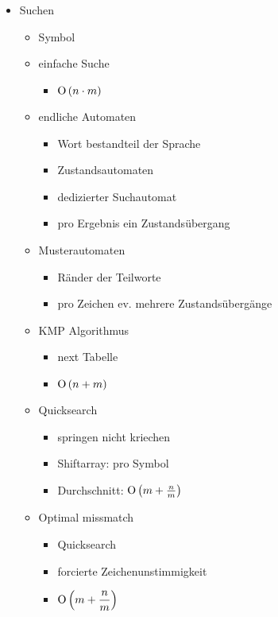 \begin{itemize}
    \item Suchen
    \begin{itemize}
        \item Symbol
        \item einfache Suche
        \begin{itemize}
            \item $\operatorname{O}\left(n \cdot m\right)$
        \end{itemize}
        \item endliche Automaten
        \begin{itemize}
            \item Wort bestandteil der Sprache
            \item Zustandsautomaten
            \item dedizierter Suchautomat
            \item pro Ergebnis ein Zustandsübergang
        \end{itemize}
        \item Musterautomaten
        \begin{itemize}
            \item Ränder der Teilworte
            \item pro Zeichen ev. mehrere Zustandsübergänge
        \end{itemize}
        \item KMP Algorithmus
        \begin{itemize}
            \item next Tabelle
            \item $\operatorname{O}\left(n + m\right)$
        \end{itemize}
        \item Quicksearch
        \begin{itemize}
            \item springen nicht kriechen
            \item Shiftarray: pro Symbol
            \item Durchschnitt: $\operatorname{O}\left(m + \frac{n}{m}\right)$
        \end{itemize}
        \item Optimal missmatch
        \begin{itemize}
            \item Quicksearch
            \item forcierte Zeichenunstimmigkeit
            \item $\operatorname{O}\left(m + \dfrac{n}{m}\right)$
        \end{itemize}
    \end{itemize}
    
\end{itemize}